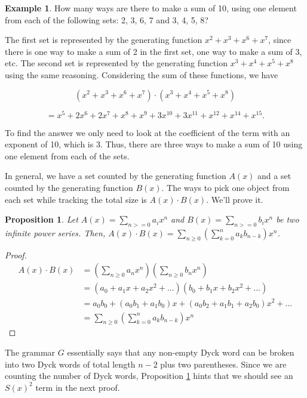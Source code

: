 \documentclass[11pt]{amsart}
\theoremstyle{plain}%
\newtheorem{prop}[thm]{Proposition}
\theoremstyle{definition}
\newtheorem{ex}[thm]{Example}
\theoremstyle{remark}
\numberwithin{equation}{thm}
\begin{document}
\begin{ex}

How many ways are there to make a sum of 10, using one element from each of the following sets: {2, 3, 6, 7} and {3, 4, 5, 8}?

The first set is represented by the generating function $x^2 + x^3 + x^6 + x^7$, since there is one way to make a sum of 2 in the first set, one way to make a sum of 3, etc. The second set is represented by the generating function $x^3 + x^4 + x^5 + x^8$ using the same reasoning. Considering the sum of these functions, we have 

$$(x^2 + x^3 + x^6 + x^7)\cdot(x^3 + x^4 + x^5 + x^8)$$

$$= x^5 + 2x^6 + 2x^7 + x^8 + x^9 + 3x^{10} + 3x^{11} + x^{12} + x^{14} + x^{15}.$$

To find the answer we only need to look at the coefficient of the term with an exponent of 10, which is 3. Thus, there are three ways to make a sum of 10 using one element from each of the sets.
\end{ex}

In general, we have a set counted by the generating function $A(x)$ and a set counted by the generating function $B(x)$. The ways to pick one object from each set while tracking the total size is $A(x) \cdot B(x)$. We'll prove it.

\begin{prop}
\label{CauchyProduct}
Let $A(x) = \sum_{n>=0} a_ix^n$ and $B(x) = \sum_{n>=0} b_ix^n$ be two infinite power series. Then, $A(x) \cdot B(x) = \sum_{n\geq0}(\sum_{k=0}^{n}a_kb_{n-k})x^n$.
\end{prop}

\begin{proof}
    \begin{align*}
        A(x) \cdot B(x) &= \left(\sum_{n\geq0} a_nx^n\right)\left(\sum_{n\geq0} b_nx^n\right)\\
        &= (a_0 + a_1x + a_2x^2 + ...)(b_0 + b_1x + b_2x^2 + ...)\\
        &= a_0b_0 + (a_0b_1 + a_1b_0)x + (a_0b_2 + a_1b_1 + a_2b_0)x^2 + ...\\
        &= \sum_{n\geq0}\left(\sum_{k=0}^{n}a_kb_{n-k}\right)x^n
    \end{align*}
\end{proof}

The grammar $G$ essentially says that any non-empty Dyck word can be broken into two Dyck words of total length $n-2$ plus two parentheses. Since we are counting the number of Dyck words, Proposition \ref{CauchyProduct} hints that we should see an $S(x)^2$ term in the next proof.
\end{document}
